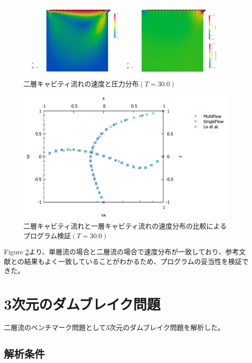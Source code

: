 \documentclass[8pt,a4paper]{article}
\begin{document}
\begin{figure}[H]
	\centering
	\includegraphics[width=18truecm]{pics/3d-cavity/velocity_pressure.pdf}
	\caption{二層キャビティ流れの速度と圧力分布$(T=30.0)$}
	\label{fig:3d-bubble-levelset_t0-3}
\end{figure}

\begin{figure}[H]
	\centering
	\includegraphics[width=18truecm]{pics/3d-cavity/velocity_graph.pdf}
	\caption{二層キャビティ流れと一層キャビティ流れの速度分布の比較によるプログラム検証$(T=30.0)$}
	\label{fig:3d-cavity_velocity_graph}
\end{figure}

Figure \ref{fig:3d-cavity_velocity_graph}より、単層流の場合と二層流の場合で速度分布が一致しており、参考文献\cite{Lo2005}との結果もよく一致していることがわかるため、プログラムの妥当性を検証できた。

\newpage
\section{3次元のダムブレイク問題}
二層流のベンチマーク問題として3次元のダムブレイク問題を解析した。

\subsection{解析条件}
\end{document}
